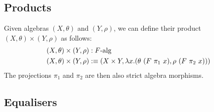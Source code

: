 \documentclass[a4paper,10pt]{report}
\begin{document}
\subsection{Products}

Given algebras $(X,\theta)$ and $(Y,\rho)$, we can define their
product $(X,\theta) \times (Y,\rho)$ as follows:
%
\begin{align*}
  &(X,\theta) \times (Y,\rho) : F\mbox{-alg}\\
  &(X,\theta) \times (Y,\rho) :\equiv (X \times Y , \lambda x . (\theta\ (F\ \pi_1\ x) , \rho\ (F\ \pi_2\ x)))
\end{align*}
%
The projections $\pi_1$ and $\pi_2$ are then also strict algebra morphisms.

\subsection{Equalisers}
\end{document}
